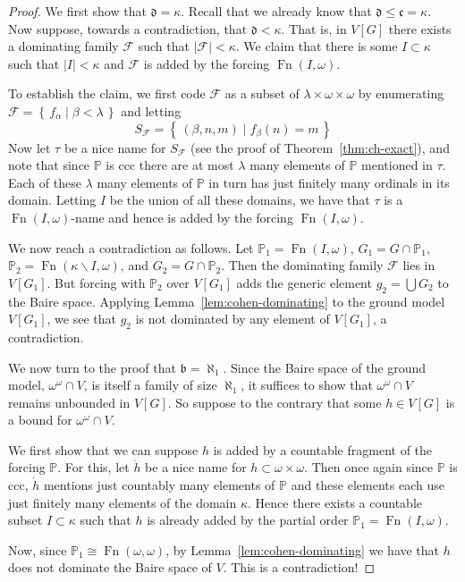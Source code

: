 \documentclass[11pt,oneside,a4paper]{amsbook}
\newcommand{\set}[1]{\left\{\,#1\,\right\}}
\newcommand{\PP}{\mathbb P}
\DeclareMathOperator{\Fn}{Fn}
\theoremstyle{definition}
\theoremstyle{plain}
\theoremstyle{definition}
\theoremstyle{remark}
\numberwithin{equation}{section}
\numberwithin{figure}{section}
\begin{document}
\begin{proof}
  We first show that $\mathfrak d=\kappa$. Recall that we already know that $\mathfrak d\leq\mathfrak c=\kappa$. Now suppose, towards a contradiction, that $\mathfrak d<\kappa$. That is, in $V[G]$ there exists a dominating family $\mathcal F$ such that $|\mathcal F|<\kappa$. We claim that there is some $I\subset\kappa$ such that $|I|<\kappa$ and $\mathcal F$ is added by the forcing $\Fn(I,\omega)$.

  To establish the claim, we first code $\mathcal F$ as a subset of $\lambda\times\omega\times\omega$ by enumerating $\mathcal F=\set{f_\alpha\mid\beta<\lambda}$ and letting
  \[S_{\mathcal F}=\set{(\beta,n,m)\mid f_\beta(n)=m}
  \]
  Now let $\tau$ be a nice name for $S_{\mathcal F}$ (see the proof of Theorem~\ref{thm:ch-exact}), and note that since $\PP$ is ccc there are at most $\lambda$ many elements of $\PP$ mentioned in $\tau$. Each of these $\lambda$ many elements of $\PP$ in turn has just finitely many ordinals in its domain. Letting $I$ be the union of all these domains, we have that $\tau$ is a $\Fn(I,\omega)$-name and hence is added by the forcing $\Fn(I,\omega)$.

  We now reach a contradiction as follows. Let $\PP_1=\Fn(I,\omega)$, $G_1=G\cap\PP_1$, $\PP_2=\Fn(\kappa\smallsetminus I,\omega)$, and $G_2=G\cap\PP_2$. Then the dominating family $\mathcal F$ lies in $V[G_1]$. But forcing with $\PP_2$ over $V[G_1]$ adds the generic element $g_2=\bigcup G_2$ to the Baire space. Applying Lemma~\ref{lem:cohen-dominating} to the ground model $V[G_1]$, we see that $g_2$ is not dominated by any element of $V[G_1]$, a contradiction.

  We now turn to the proof that $\mathfrak b=\aleph_1$. Since the Baire space of the ground model, $\omega^\omega\cap V$, is itself a family of size $\aleph_1$, it suffices to show that $\omega^\omega\cap V$ remains unbounded in $V[G]$. So suppose to the contrary that some $h\in V[G]$ is a bound for $\omega^\omega\cap V$.

  We first show that we can suppose $h$ is added by a countable fragment of the forcing $\PP$. For this, let $\dot h$ be a nice name for $h\subset\omega\times\omega$. Then once again since $\PP$ is ccc, $\dot h$ mentions just countably many elements of $\PP$ and these elements each use just finitely many elements of the domain $\kappa$. Hence there exists a countable subset $I\subset\kappa$ such that $h$ is already added by the partial order $\PP_1=\Fn(I,\omega)$.

  Now, since $\PP_1\cong\Fn(\omega,\omega)$, by Lemma~\ref{lem:cohen-dominating} we have that $h$ does not dominate the Baire space of $V$. This is a contradiction!
\end{proof}
\end{document}
